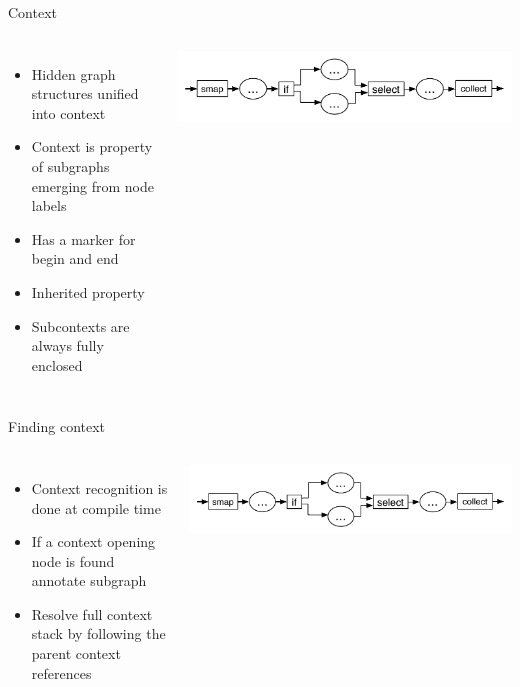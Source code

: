\documentclass[utf8x,10pt,aspectratio=169]{beamer}
\begin{document}
\begin{frame}{Context}
	
	\begin{columns}
		
		\begin{itemize}[<+->]
		
			\item Hidden graph structures unified into context
			\item Context is property of subgraphs emerging from node labels
			\item Has a marker for begin and end
			\item Inherited property
			\item Subcontexts are always fully enclosed
			
		\end{itemize}
		
		
		\includegraphics[width=\textwidth]{graphs/context-example}
			
	\end{columns}


	
\end{frame}

\begin{frame}{Finding context}

	\begin{columns}
		\column{0.4\textwidth}
	
		\begin{itemize}[<+->]
			\item Context recognition is done at compile time
			\item If a context opening node is found annotate subgraph
			\item Resolve full context stack by following the parent context references
		\end{itemize}
	
		\column{0.6\textwidth}
		
		\includegraphics[width=\textwidth]{graphs/context-example}
	\end{columns}
	
\end{frame}
\end{document}

